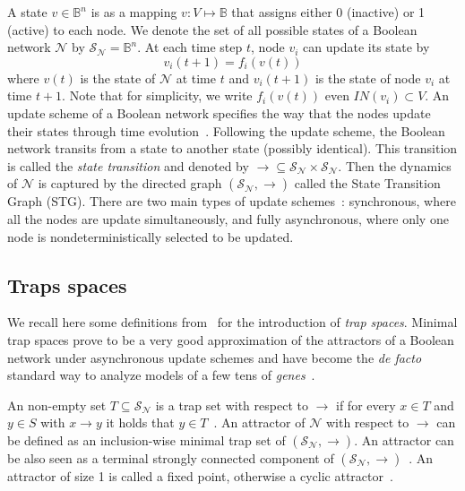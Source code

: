 \documentclass[preprint,12pt]{elsarticle}
\begin{document}
A state \(v \in \mathbb{B}^{n}\) is as a mapping \(v \colon V \mapsto \mathbb{B}\) that assigns either 0 (inactive) or 1 (active) to each node.
We denote the set of all possible states of a Boolean network \(\mathcal{N}\) by \(\mathcal{S}_{\mathcal{N}} = \mathbb{B}^n\).
At each time step \(t\), node \(v_i\) can update its state by
\[v_i(t + 1) = f_i(v(t))\]
where \(v(t)\) is the state of \(\mathcal{N}\) at time \(t\) and \(v_i(t + 1)\) is the state of node \(v_i\) at time \(t + 1\).
Note that for simplicity, we write \(f_i(v(t))\) even \(IN(v_i) \subset V\).
An update scheme of a Boolean network specifies the way that the nodes update their states through time evolution~\cite{thomas1991regulatory}. 
Following the update scheme, the Boolean network transits from a state to another state (possibly identical).
This transition is called the \emph{state transition} and denoted by \(\rightarrow \subseteq \mathcal{S}_{\mathcal{N}} \times \mathcal{S}_{\mathcal{N}}\).
Then the dynamics of \(\mathcal{N}\) is captured by the directed graph \((\mathcal{S}_{\mathcal{N}}, \rightarrow)\) called the State Transition Graph (STG).
There are two main types of update schemes~\cite{thomas1991regulatory}: synchronous, where all the nodes are update simultaneously, and fully asynchronous, where only one node is nondeterministically selected to be updated.

\subsection{Traps spaces}

We recall here some definitions from~\cite{klarner2015computing} for the introduction of \emph{trap spaces}.
Minimal trap spaces prove to be a very good approximation of the attractors of a Boolean network under asynchronous update schemes and have become the \emph{de facto} standard way to analyze models of a few tens of \emph{genes}~\cite{klarner2017pyboolnet,cifuentes2020control}.

An non-empty set \(T \subseteq \mathcal{S}_{\mathcal{N}}\) is a trap set with respect to \(\rightarrow\) if for every \(x \in T\) and \(y \in S\) with \(x \rightarrow y\) it holds that \(y \in T\)~\cite{klarner2015computing}.
An attractor of \(\mathcal{N}\) with respect to \(\rightarrow\) can be defined as an inclusion-wise minimal trap set of \((\mathcal{S}_{\mathcal{N}}, \rightarrow)\).
An attractor can be also seen as a terminal strongly connected component of \((\mathcal{S}_{\mathcal{N}}, \rightarrow)\)~\cite{chatain2014characterization}.
An attractor of size 1 is called a fixed point, otherwise a cyclic attractor~\cite{klarner2015computing}.
\end{document}
